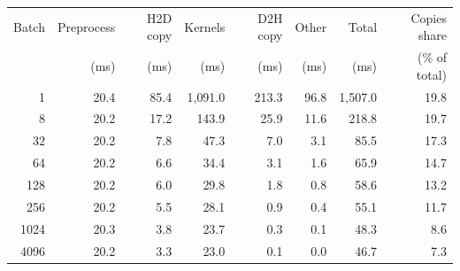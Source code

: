\begin{tabular}{rrrrrrrr}
\toprule
Batch & Preprocess & H2D copy & Kernels & D2H copy & Other & Total & Copies share \\
 & (ms) & (ms) & (ms) & (ms) & (ms) & (ms) & (\% of total) \\
\midrule
1 & 20.4 & 85.4 & 1{,}091.0 & 213.3 & 96.8 & 1{,}507.0 & 19.8 \\
8 & 20.2 & 17.2 & 143.9 & 25.9 & 11.6 & 218.8 & 19.7 \\
32 & 20.2 & 7.8 & 47.3 & 7.0 & 3.1 & 85.5 & 17.3 \\
64 & 20.2 & 6.6 & 34.4 & 3.1 & 1.6 & 65.9 & 14.7 \\
128 & 20.2 & 6.0 & 29.8 & 1.8 & 0.8 & 58.6 & 13.2 \\
256 & 20.2 & 5.5 & 28.1 & 0.9 & 0.4 & 55.1 & 11.7 \\
1024 & 20.3 & 3.8 & 23.7 & 0.3 & 0.1 & 48.3 & 8.6 \\
4096 & 20.2 & 3.3 & 23.0 & 0.1 & 0.0 & 46.7 & 7.3 \\
\bottomrule
\end{tabular}
